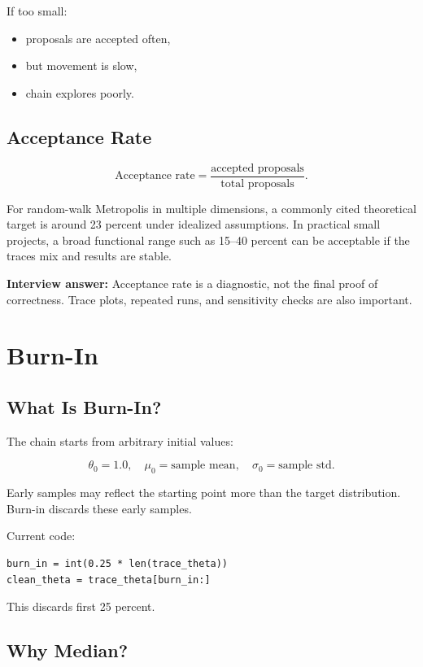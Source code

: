 \documentclass[11pt]{article}
\begin{document}
If too small:

\begin{itemize}
  \item proposals are accepted often,
  \item but movement is slow,
  \item chain explores poorly.
\end{itemize}

\subsection{Acceptance Rate}

\[
\text{Acceptance rate}
=
\frac{\text{accepted proposals}}{\text{total proposals}}.
\]

For random-walk Metropolis in multiple dimensions, a commonly cited theoretical
target is around 23 percent under idealized assumptions. In practical small
projects, a broad functional range such as 15--40 percent can be acceptable if
the traces mix and results are stable.

\textbf{Interview answer:} Acceptance rate is a diagnostic, not the final proof
of correctness. Trace plots, repeated runs, and sensitivity checks are also
important.

\section{Burn-In}

\subsection{What Is Burn-In?}

The chain starts from arbitrary initial values:

\[
\theta_0=1.0,\quad
\mu_0=\text{sample mean},\quad
\sigma_0=\text{sample std}.
\]

Early samples may reflect the starting point more than the target distribution.
Burn-in discards these early samples.

Current code:

\begin{lstlisting}[style=pythonstyle]
burn_in = int(0.25 * len(trace_theta))
clean_theta = trace_theta[burn_in:]
\end{lstlisting}

This discards first 25 percent.

\subsection{Why Median?}
\end{document}
